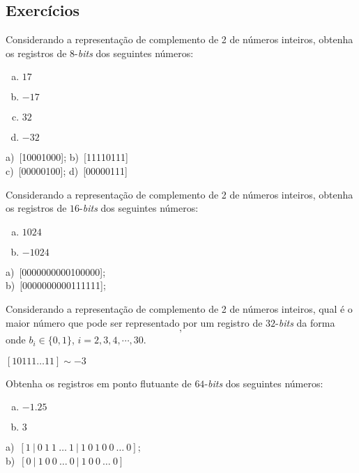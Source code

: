 \subsection{Exercícios}

\begin{exer}
  Considerando a representação de complemento de 2 de números inteiros, obtenha os registros de $8$-{\it bits} dos seguintes números:
  \begin{enumerate}[a)]
  \item $17$
  \item $-17$
  \item $32$
  \item $-32$
  \end{enumerate}
\end{exer}
\begin{resp}
  a)~[10001000]; b)~[11110111]\\
  c)~[00000100]; d)~[00000111]
\end{resp}

\begin{exer}
  Considerando a representação de complemento de 2 de números inteiros, obtenha os registros de $16$-{\it bits} dos seguintes números:
  \begin{enumerate}[a)]
  \item $1024$
  \item $-1024$
  \end{enumerate}
\end{exer}
\begin{resp}
    a)~[0000000000100000]; \\
    b)~[0000000000111111];
\end{resp}

\begin{exer}
  Considerando a representação de complemento de 2 de números inteiros, qual é o maior número que pode ser representado por um registro de $32$-{\it bits} da forma
  \begin{equation}
    [1 ~ 0 ~ b_2 ~ b_3 ~ b_4 ~ \cdots ~ b_{30} ~ 1],
  \end{equation}
onde $b_i \in \{0, 1\}$, $i=2, 3, 4, \cdots, 30$.
\end{exer}
\begin{resp}
  $[10111 \ldots 11] \sim -3$
\end{resp}

\begin{exer}
  Obtenha os registros em ponto flutuante de $64$-{\it bits} dos seguintes números:
  \begin{enumerate}[a)]
  \item $-1.25$
  \item $3$
  \end{enumerate}
\end{exer}
\begin{resp}
    a)~$[1 ~ | ~ 0 ~ 1 ~ 1 ~ \ldots ~ 1 ~ | ~ 1 ~ 0 ~ 1 ~ 0 ~ 0 ~ \ldots ~ 0]$;\\
    b)~$[0 ~ | ~ 1 ~ 0 ~ 0 ~ \ldots ~ 0 ~ | ~ 1 ~ 0 ~ 0 ~ \ldots ~ 0]$
\end{resp}

